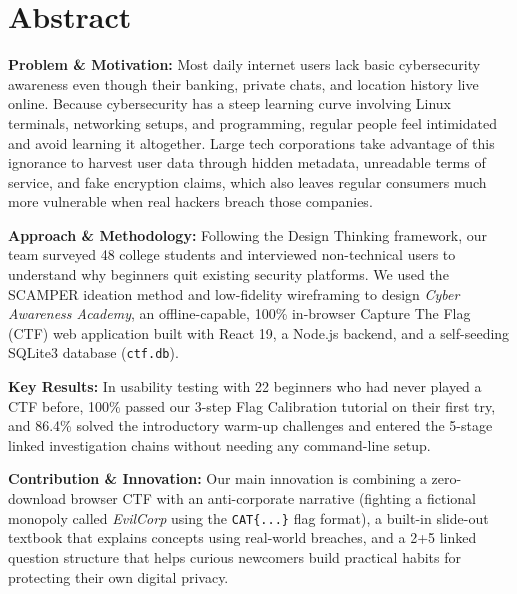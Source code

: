 \documentclass[11pt,a4paper]{article}
\begin{document}
\clearpage
{}
\setcounter{page}{1}

\tableofcontents
\clearpage

\setcounter{page}{1}

\section*{Abstract}

\noindent
\textbf{Problem \& Motivation:} Most daily internet users lack basic cybersecurity awareness even though their banking, private chats, and location history live online. Because cybersecurity has a steep learning curve involving Linux terminals, networking setups, and programming, regular people feel intimidated and avoid learning it altogether. Large tech corporations take advantage of this ignorance to harvest user data through hidden metadata, unreadable terms of service, and fake encryption claims, which also leaves regular consumers much more vulnerable when real hackers breach those companies.

\noindent
\textbf{Approach \& Methodology:} Following the Design Thinking framework, our team surveyed 48 college students and interviewed non-technical users to understand why beginners quit existing security platforms. We used the SCAMPER ideation method and low-fidelity wireframing to design \textit{Cyber Awareness Academy}, an offline-capable, 100\% in-browser Capture The Flag (CTF) web application built with React 19, a Node.js backend, and a self-seeding SQLite3 database (\texttt{ctf.db}).

\noindent
\textbf{Key Results:} In usability testing with 22 beginners who had never played a CTF before, 100\% passed our 3-step Flag Calibration tutorial on their first try, and 86.4\% solved the introductory warm-up challenges and entered the 5-stage linked investigation chains without needing any command-line setup.

\noindent
\textbf{Contribution \& Innovation:} Our main innovation is combining a zero-download browser CTF with an anti-corporate narrative (fighting a fictional monopoly called \textit{EvilCorp} using the \texttt{CAT\{...\}} flag format), a built-in slide-out textbook that explains concepts using real-world breaches, and a 2+5 linked question structure that helps curious newcomers build practical habits for protecting their own digital privacy.
\end{document}
